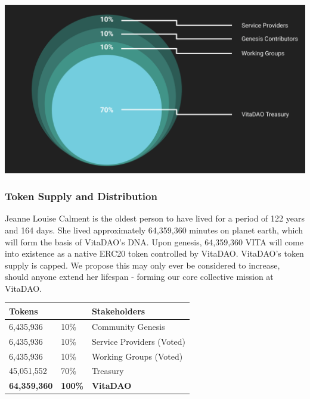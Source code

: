 \documentclass[12pt,letterpaper]{article}
\begin{document}
\vspace{15pt}
\begin{center}
\includegraphics[width=\linewidth]{images/Initial Token Allocation.png} 
\end{center}

\subsubsection{Token Supply and Distribution}
Jeanne Louise Calment is the oldest person to have lived for a period of 122 years and 164 days. She lived approximately 64,359,360 minutes on planet earth, which will form the basis of VitaDAO’s DNA. Upon genesis, 64,359,360 VITA will come into existence as a native ERC20 token controlled by VitaDAO. VitaDAO’s token supply is capped. We propose this may only ever be considered to increase, should anyone extend her lifespan - forming our core collective mission at VitaDAO.

\begin{table}[h!]
  \begin{center}
    \setlength{\extrarowheight}{5pt}
	\begin{tabular}{p{}p{}p{}}
		\textbf{Tokens} & & \textbf{Stakeholder}s \\ 
		\hline
		6,435,936 & 10\% & Community Genesis \\ 
		6,435,936 & 10\% & Service Providers (Voted) \\ 
		6,435,936 & 10\% & Working Groups (Voted) \\ 
		45,051,552 & 70\% & Treasury \\ 
		\hline 
		\textbf{64,359,360} & \textbf{100\%} & \textbf{VitaDAO} \\ 
		\hline 
	\end{tabular} 
  \end{center}
\end{table}
\end{document}
